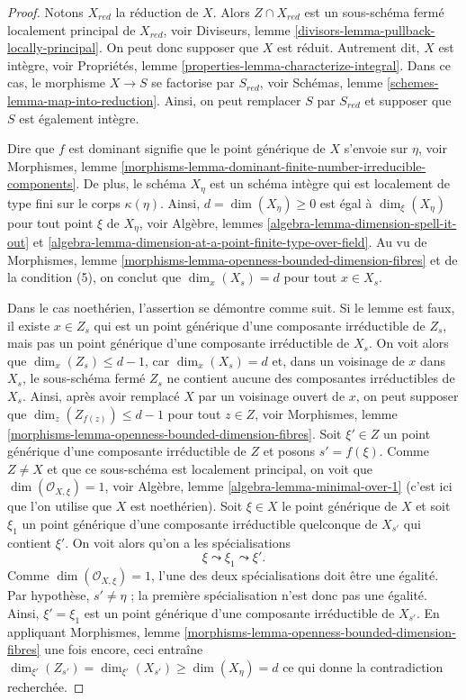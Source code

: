 \begin{proof}
Notons $X_{red}$ la réduction de $X$. Alors $Z \cap X_{red}$ est
un sous-schéma fermé localement principal de $X_{red}$, voir
Diviseurs, lemme \ref{divisors-lemma-pullback-locally-principal}.
On peut donc supposer que $X$ est réduit. Autrement dit, $X$ est intègre, voir
Propriétés, lemme \ref{properties-lemma-characterize-integral}.
Dans ce cas, le morphisme $X \to S$ se factorise par $S_{red}$, voir
Schémas, lemme \ref{schemes-lemma-map-into-reduction}.
Ainsi, on peut remplacer $S$ par $S_{red}$ et supposer que $S$ est également intègre.

\medskip\noindent
Dire que $f$ est dominant signifie que le point générique de $X$
s'envoie sur $\eta$, voir
Morphismes,
lemme \ref{morphisms-lemma-dominant-finite-number-irreducible-components}.
De plus, le schéma $X_\eta$ est un schéma intègre qui est localement de
type fini sur le corps $\kappa(\eta)$. Ainsi,
$d = \dim(X_\eta) \geq 0$ est égal à $\dim_\xi(X_\eta)$ pour
tout point $\xi$ de $X_\eta$, voir
Algèbre, lemmes \ref{algebra-lemma-dimension-spell-it-out} et
\ref{algebra-lemma-dimension-at-a-point-finite-type-over-field}.
Au vu de
Morphismes, lemme \ref{morphisms-lemma-openness-bounded-dimension-fibres}
et de la condition (5), on conclut que $\dim_x(X_s) = d$
pour tout $x \in X_s$.

\medskip\noindent
Dans le cas noethérien, l'assertion se démontre comme suit.
Si le lemme est faux, il existe $x \in Z_s$ qui est un point générique
d'une composante irréductible de $Z_s$, mais pas un point générique
d'une composante irréductible de $X_s$. On voit alors que
$\dim_x(Z_s) \leq d - 1$, car $\dim_x(X_s) = d$ et, dans un voisinage
de $x$ dans $X_s$, le sous-schéma fermé $Z_s$ ne contient aucune des
composantes irréductibles de $X_s$. Ainsi, après avoir remplacé $X$ par un
voisinage ouvert de $x$, on peut supposer que
$\dim_z(Z_{f(z)}) \leq d - 1$ pour tout $z \in Z$, voir
Morphismes, lemme \ref{morphisms-lemma-openness-bounded-dimension-fibres}.
Soit $\xi' \in Z$ un point générique d'une composante irréductible de $Z$
et posons $s' = f(\xi)$. Comme $Z \not = X$ et que ce sous-schéma est localement principal, on voit que
$\dim(\mathcal{O}_{X, \xi}) = 1$, voir
Algèbre, lemme \ref{algebra-lemma-minimal-over-1}
(c'est ici que l'on utilise que $X$ est noethérien).
Soit $\xi \in X$ le point générique de $X$ et
soit $\xi_1$ un point générique d'une composante irréductible quelconque
de $X_{s'}$ qui contient $\xi'$. On voit alors qu'on a
les spécialisations
$$
\xi \leadsto \xi_1 \leadsto \xi'.
$$
Comme $\dim(\mathcal{O}_{X, \xi}) = 1$, l'une des deux spécialisations
doit être une égalité.
Par hypothèse, $s' \not = \eta$ ; la première spécialisation
n'est donc pas une égalité.
Ainsi, $\xi' = \xi_1$ est un point générique d'une composante irréductible de
$X_{s'}$. En appliquant
Morphismes, lemme \ref{morphisms-lemma-openness-bounded-dimension-fibres}
une fois encore, ceci entraîne
$\dim_{\xi'}(Z_{s'}) = \dim_{\xi'}(X_{s'}) \geq \dim(X_\eta) = d$
ce qui donne la contradiction recherchée.


\end{proof}
